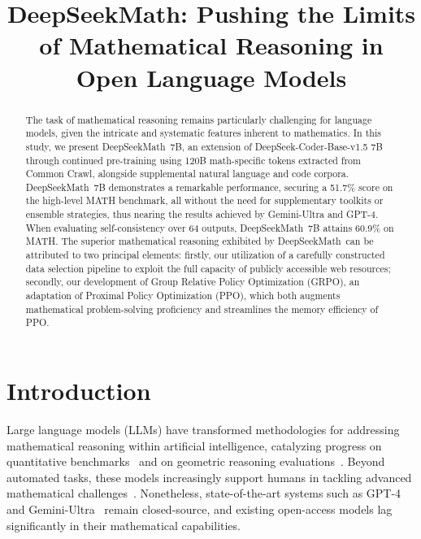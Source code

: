 \title{DeepSeekMath: Pushing the Limits of Mathematical Reasoning in Open Language Models}

\begin{abstract}
The task of mathematical reasoning remains particularly challenging for language models, given the intricate and systematic features inherent to mathematics. In this study, we present DeepSeekMath~7B, an extension of DeepSeek-Coder-Base-v1.5 7B through continued pre-training using 120B math-specific tokens extracted from Common Crawl, alongside supplemental natural language and code corpora. DeepSeekMath~7B demonstrates a remarkable performance, securing a 51.7\% score on the high-level MATH benchmark, all without the need for supplementary toolkits or ensemble strategies, thus nearing the results achieved by Gemini-Ultra and GPT-4. When evaluating self-consistency over 64 outputs, DeepSeekMath~7B attains 60.9\% on MATH. The superior mathematical reasoning exhibited by DeepSeekMath~can be attributed to two principal elements: firstly, our utilization of a carefully constructed data selection pipeline to exploit the full capacity of publicly accessible web resources; secondly, our development of Group Relative Policy Optimization (GRPO), an adaptation of Proximal Policy Optimization (PPO), which both augments mathematical problem-solving proficiency and streamlines the memory efficiency of PPO.
\end{abstract}

\section{Introduction}

Large language models (LLMs) have transformed methodologies for addressing mathematical reasoning within artificial intelligence, catalyzing progress on quantitative benchmarks~\citep{MATH} and on geometric reasoning evaluations~\citep{trinh2024solving}. Beyond automated tasks, these models increasingly support humans in tackling advanced mathematical challenges~\citep{tao}. Nonetheless, state-of-the-art systems such as GPT-4~\citep{gpt4} and Gemini-Ultra~\citep{gemini} remain closed-source, and existing open-access models lag significantly in their mathematical capabilities.

